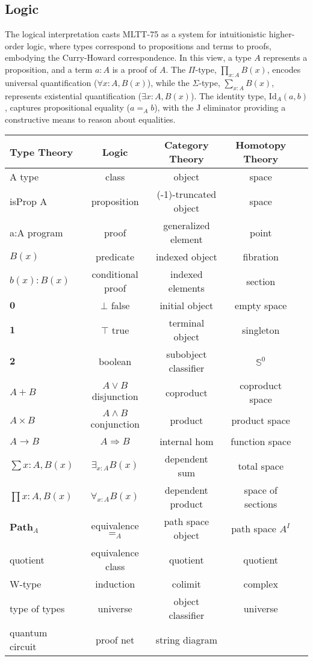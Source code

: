 \documentclass{article}
\theoremstyle{definition}
\begin{document}
\subsection{Logic}
The logical interpretation casts MLTT-75 as a system for
intuitionistic higher-order logic, where types correspond
to propositions and terms to proofs, embodying the Curry-Howard
correspondence. In this view, a type $A$ represents a proposition,
and a term $a : A$ is a proof of $A$. The $\Pi$-type, $\prod_{x:A} B(x)$,
encodes universal quantification ($\forall x : A, B(x)$),
while the $\Sigma$-type, $\sum_{x:A} B(x)$, represents existential
quantification ($\exists x : A, B(x)$). The identity type, $\text{Id}_A(a, b)$,
captures propositional equality ($a =_A b$), with the J eliminator providing a
constructive means to reason about equalities.

\begin{table}[!ht]
  \begin{tabular}{lcccc}
    \hline
       Type Theory & Logic & Category Theory & Homotopy Theory\\
    \hline
       A type & class & object & space \\
       isProp A & proposition & (-1)-truncated object & space \\
       a:A program & proof & generalized element & point \\
       $B(x)$ & predicate & indexed object & fibration \\
       $b(x) : B(x)$ & conditional proof & indexed elements & section\\
       $\mathbf{0}$ & $\bot$ false & initial object & empty space \\
       $\mathbf{1}$ & $\top$ true & terminal object & singleton \\
       $\mathbf{2}$ & boolean & subobject classifier & $\mathbb{S}^0$ \\
       $A + B$ & $A\vee B$ disjunction & coproduct & coproduct space \\
       $A\times B$ & $A\wedge B$ conjunction & product & product space \\
       $A\to B$ & $A\Rightarrow B$ & internal hom & function space \\
       $\sum{x:A},B(x)$ & $\exists_{x:A}B(x)$ & dependent sum & total space \\
       $\prod{x:A},B(x)$ & $\forall_{x:A}B(x)$ & dependent product & space of sections\\
       $\mathbf{Path}_{A}$ & equivalence $=_A$ & path space object & path space $A^I$ \\
       quotient & equivalence class & quotient & quotient \\
       W-type & induction & colimit & complex\\
       type of types & universe & object classifier & universe \\
       quantum circuit & proof net & string diagram & \\
      \hline
  \end{tabular}
\end{table}
\end{document}
